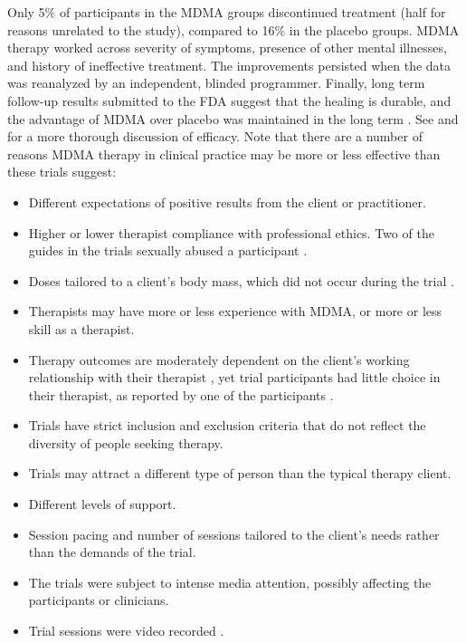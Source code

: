 \documentclass[12pt,letterpaper]{book}
\begin{document}
Only 5\% of participants in the MDMA groups discontinued treatment (half for reasons unrelated to the study), compared to 16\% in the placebo groups. MDMA therapy worked across severity of symptoms, presence of other mental illnesses, and history of ineffective treatment. The improvements persisted when the data was reanalyzed by an independent, blinded programmer. Finally, long term follow-up results submitted to the FDA suggest that the healing is durable, and the advantage of MDMA over placebo was maintained in the long term \cite{mplongPreliminary}. See \textcite{wolfgang2025} and \textcite{icerReport} for a more thorough discussion of efficacy. Note that there are a number of reasons MDMA therapy in clinical practice may be more or less effective than these trials suggest:
\begin{itemize}
    \item Different expectations of positive results from the client or practitioner.
    \item Higher or lower therapist compliance with professional ethics. Two of the guides in the trials sexually abused a participant \cite{powerTrip}.
    \item Doses tailored to a client's body mass, which did not occur during the trial \cite{mitchellMDMAClinicalTrial}.
    \item Therapists may have more or less experience with MDMA, or more or less skill as a therapist.
    \item Therapy outcomes are moderately dependent on the client's working relationship with their therapist \cite{fluckiger2018alliance}, yet trial participants had little choice in their therapist, as reported by one of the participants \cite{kacandaNoChoice}.
    \item Trials have strict inclusion and exclusion criteria that do not reflect the diversity of people seeking therapy.
    \item Trials may attract a different type of person than the typical therapy client.
    \item Different levels of support.
    \item Session pacing and number of sessions tailored to the client's needs rather than the demands of the trial.
    \item The trials were subject to intense media attention, possibly affecting the participants or clinicians.
    \item Trial sessions were video recorded \cite{mitchellMDMAClinicalTrial}.
\end{itemize}
\end{document}
